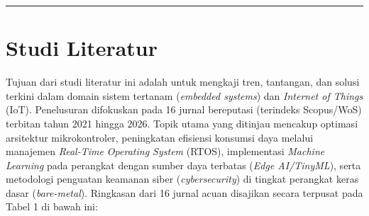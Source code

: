 \documentclass[11pt,a4paper]{article}
\begin{document}
\newpage
\text{ }
\hrule
\vspace{0.5cm}

\section{Studi Literatur}
\hspace{1.5em}Tujuan dari studi literatur ini adalah untuk mengkaji tren, tantangan, dan solusi terkini dalam domain sistem tertanam (\textit{embedded systems}) dan \textit{Internet of Things} (IoT). Penelusuran difokuskan pada 16 jurnal bereputasi (terindeks Scopus/WoS) terbitan tahun 2021 hingga 2026. Topik utama yang ditinjau mencakup optimasi arsitektur mikrokontroler, peningkatan efisiensi konsumsi daya melalui manajemen \textit{Real-Time Operating System} (RTOS), implementasi \textit{Machine Learning} pada perangkat dengan sumber daya terbatas (\textit{Edge AI/TinyML}), serta metodologi penguatan keamanan siber (\textit{cybersecurity}) di tingkat perangkat keras dasar (\textit{bare-metal}). Ringkasan dari 16 jurnal acuan disajikan secara terpusat pada Tabel 1 di bawah ini:
\end{document}

